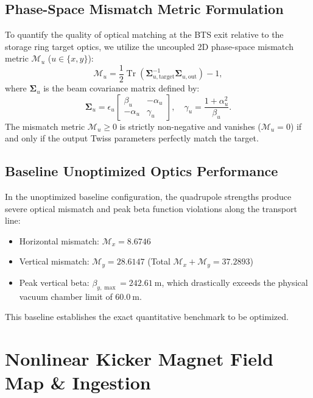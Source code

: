 \documentclass[a4paper,11pt]{article}
\begin{document}
\subsection{Phase-Space Mismatch Metric Formulation}

To quantify the quality of optical matching at the BTS exit relative to the storage ring target optics, we utilize the uncoupled 2D phase-space mismatch metric $\mathcal{M}_u$ ($u \in \{x, y\}$):
\begin{equation}
\mathcal{M}_u = \frac{1}{2} \operatorname{Tr}\left(\mathbf{\Sigma}_{u,\text{target}}^{-1} \mathbf{\Sigma}_{u,\text{out}}\right) - 1,
\label{eq:mismatch}
\end{equation}
where $\mathbf{\Sigma}_u$ is the beam covariance matrix defined by:
\begin{equation}
\mathbf{\Sigma}_u = \epsilon_u \begin{bmatrix} \beta_u & -\alpha_u \\ -\alpha_u & \gamma_u \end{bmatrix}, \quad \gamma_u = \frac{1 + \alpha_u^2}{\beta_u}.
\end{equation}
The mismatch metric $\mathcal{M}_u \ge 0$ is strictly non-negative and vanishes ($\mathcal{M}_u = 0$) if and only if the output Twiss parameters perfectly match the target.

\subsection{Baseline Unoptimized Optics Performance}

In the unoptimized baseline configuration, the quadrupole strengths produce severe optical mismatch and peak beta function violations along the transport line:
\begin{itemize}
    \item Horizontal mismatch: $\mathcal{M}_x = 8.6746$
    \item Vertical mismatch: $\mathcal{M}_y = 28.6147$ (Total $\mathcal{M}_x + \mathcal{M}_y = 37.2893$)
    \item Peak vertical beta: $\beta_{y,\max} = 242.61~\mathrm{m}$, which drastically exceeds the physical vacuum chamber limit of $60.0~\mathrm{m}$.
\end{itemize}
This baseline establishes the exact quantitative benchmark to be optimized.

\section{Nonlinear Kicker Magnet Field Map \& Ingestion}
\label{sec:nkm_field}
\end{document}
